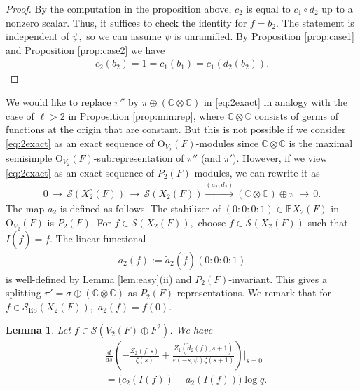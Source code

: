 \documentclass[11pt,a4paper,reqno]{amsart}
\newtheorem{lem}[thm]{Lemma}
\theoremstyle{remark}
\numberwithin{equation}{section}
\newcommand{\lto}{\,\longrightarrow\,}
\newcommand{\CC}{\mathbb{C}}
\newcommand{\quash}[1]{}
\theoremstyle{definition}
\numberwithin{equation}{section}
\begin{document}
\begin{proof}
By the computation in the proposition above, $c_2$ is equal to $c_1\circ d_2$ up to a nonzero scalar. Thus, it suffices to check the identity for $f=b_2$. The statement is independent of $\psi,$ so we can assume $\psi$ is unramified. By Proposition \ref{prop:case1} and  Proposition \ref{prop:case2} we have 
\begin{align*}
c_2(b_2)=1=c_1(b_1)=c_1(d_2(b_2)).\end{align*}
\end{proof}


We would like to replace $\pi''$ by $\pi \oplus (\CC\otimes\CC)$ in \eqref{eq:2exact} 
in analogy with the case of $\ell>2$ in Proposition \ref{prop:min:rep}, where $\CC\otimes\CC$ consists of germs of functions at the origin that are constant. But this is not possible if we consider \eqref{eq:2exact}  as an exact sequence of $\mathrm{O}_{V_2}(F)$-modules since $\CC\otimes\CC$ is the maximal semisimple $\mathrm{O}_{V_2}(F)$-subrepresentation of $\pi''$ (and $\pi'$). \quash{Indeed,  and the quotient consists of functions that are constant multiplies of $\log_{1/q}(|\cdot|)$ near zero.} However, if we view \eqref{eq:2exact} as an exact sequence of $P_2(F)$-modules, we can rewrite it as
\begin{align} \label{a2}
    0\lto \mathcal{S}(X_{2}^\circ(F))\lto \mathcal{S}(X_{2}(F))\xrightarrow{(a_2, d_2)} (\CC\otimes\CC)\oplus \pi\lto 0.
\end{align}
The map $a_2$ is defined as follows. The stabilizer of $(0:0:0:1)\in \mathbb{P}X_2(F)$ in $\mathrm{O}_{V_2}(F)$ is $P_2(F)$. For $f\in \mathcal{S}(X_2(F)),$ choose $\tilde{f}\in \widetilde{\mathcal{S}}(X_2(F))$ such that $I(\tilde{f})=f$. The linear functional
\begin{align*}
    a_2(f):=\tilde{a}_2(\tilde{f})(0:0:0:1)
\end{align*}
is well-defined by Lemma \ref{lem:easy}(ii) and $P_2(F)$-invariant. This gives a splitting \sloppy $\pi'=\sigma\oplus (\CC\otimes\CC)$ as $P_2(F)$-representations. We remark that for $f\in \mathcal{S}_{\mathrm{ES}}(X_{2}(F)),$ $a_2(f)=f(0).$

\begin{lem}\label{lem:der}
Let $f\in \mathcal{S}(V_2(F)\oplus F^2)$. We have 
\begin{align*}
    &\frac{d}{ds} \left(-\frac{Z_{2}(f,s)}{\zeta(s)}+\frac{Z_{1}(\tilde{d}_2(f), s+1)}{\varepsilon(-s,\psi)\zeta(s+1)}\right)\Bigg|_{s=0}\\
    &=\big(c_2(I(f))-a_2(I(f))\big)\log q.
\end{align*}
\end{lem}
\end{document}
